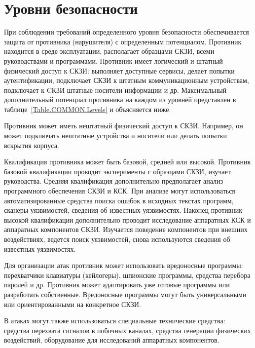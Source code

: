 \section{Уровни безопасности}\label{COMMON.Levels}

При соблюдении требований определенного уровня безопасности обеспечивается
защита от противника (нарушителя) с определенным потенциалом.
%
Противник находится в среде эксплуатации, 
располагает образцами СКЗИ, 
всеми руководствами и программами. 
%
Противник имеет логический и штатный физический доступ к СКЗИ: 
выполняет доступные сервисы, 
делает попытки аутентификации,
подключает СКЗИ к штатным коммуникационным устройствам, 
подключает к CКЗИ штатные носители информации и др. 
%
Максимальный дополнительный потенциал противника на каждом из уровней 
представлен в таблице~\ref{Table.COMMON.Levels} и объясняется ниже.

Противник может иметь нештатный физический доступ к СКЗИ.
Например, он может подключать нештатные устройства и носители или 
делать попытки вскрытия корпуса.

Квалификация противника может быть базовой, средней или высокой.
%
Противник базовой квалификации проводит эксперименты с образцами СКЗИ, 
изучает руководства. 
%
Средняя квалификация дополнительно предполагает анализ программного обеспечения 
СКЗИ и КСК. При анализе могут использоваться автоматизированные средства поиска 
ошибок в исходных текстах программ, сканеры уязвимостей, сведения об известных 
уязвимостях.
%
Наконец противник высокой квалификации дополнительно проводит исследование
аппаратных КСК и аппаратных компонентов СКЗИ. Изучается поведение 
компонентов при внешних воздействиях, ведется поиск уязвимостей, 
снова используются сведения об известных уязвимостях.


Для организации атак противник может использовать вредоносные программы:
перехватчики клавиатуры (кейлогеры), шпионские программы, 
средства перебора паролей и др. 
%
Противник может адаптировать уже готовые программы или разработать собственные. 
%
Вредоносные программы могут быть универсальными или ориентированными на 
конкретное СКЗИ.

В атаках могут также использоваться специальные технические средства: 
средства перехвата сигналов в побочных каналах,
средства генерации физических воздействий,
оборудование для исследований аппаратных компонентов.

